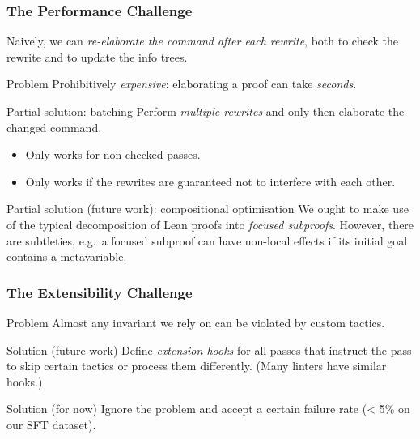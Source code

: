\begin{frame}
  \frametitle{The Performance Challenge}

  Naively, we can \emph{re-elaborate the command after each rewrite}, both to check the rewrite and to update the info trees.

  \begin{block}{Problem}
    Prohibitively \emph{expensive}: elaborating a proof can take \emph{seconds}.
  \end{block}

  \begin{block}{Partial solution: batching}
    Perform \emph{multiple rewrites} and only then elaborate the changed command.

    \begin{itemize}
      \item Only works for non-checked passes.
      \item Only works if the rewrites are guaranteed not to interfere with each other.
    \end{itemize}
  \end{block}

  \pause

  \begin{block}{Partial solution (future work): compositional optimisation}
    We ought to make use of the typical decomposition of Lean proofs into \emph{focused subproofs}.
    However, there are subtleties, e.g.\ a focused subproof can have non-local effects if its initial goal contains a metavariable.
  \end{block}
\end{frame}

\begin{frame}
  \frametitle{The Extensibility Challenge}

  \begin{block}{Problem}
    Almost any invariant we rely on can be violated by custom tactics.
  \end{block}

  \begin{block}{Solution (future work)}
    Define \emph{extension hooks} for all passes that instruct the pass to skip certain tactics or process them differently.
    (Many linters have similar hooks.)
  \end{block}

  \pause

  \begin{block}{Solution (for now)}
    Ignore the problem and accept a certain failure rate (< 5\% on our SFT dataset).
  \end{block}
\end{frame}

